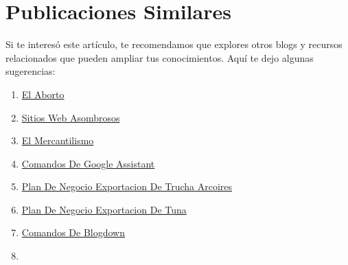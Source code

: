 \documentclass[
  jou,
  floatsintext,
  longtable,
  a4paper,
  nolmodern,
  notxfonts,
  notimes,
  colorlinks=true,linkcolor=blue,citecolor=blue,urlcolor=blue]{apa7}
\providecommand{\tightlist}{%
  \setlength{\itemsep}{0pt}\setlength{\parskip}{0pt}}
\begin{document}
\section{Publicaciones Similares}\label{publicaciones-similares}

Si te interesó este artículo, te recomendamos que explores otros blogs y
recursos relacionados que pueden ampliar tus conocimientos. Aquí te dejo
algunas sugerencias:

\begin{enumerate}
\def\labelenumi{\arabic{enumi}.}
\tightlist
\item
  \href{https://achalmaedison.netlify.app/blog/posts/2015-05-14-el-aborto/index.pdf}{}
  \href{https://achalmaedison.netlify.app/blog/posts/2015-05-14-el-aborto}{El
  Aborto}
\item
  \href{https://achalmaedison.netlify.app/blog/posts/2017-04-23-sitios-web-asombrosos/index.pdf}{}
  \href{https://achalmaedison.netlify.app/blog/posts/2017-04-23-sitios-web-asombrosos}{Sitios
  Web Asombrosos}
\item
  \href{https://achalmaedison.netlify.app/blog/posts/2017-05-23-el-mercantilismo/index.pdf}{}
  \href{https://achalmaedison.netlify.app/blog/posts/2017-05-23-el-mercantilismo}{El
  Mercantilismo}
\item
  \href{https://achalmaedison.netlify.app/blog/posts/2020-05-23-comandos-de-google-assistant/index.pdf}{}
  \href{https://achalmaedison.netlify.app/blog/posts/2020-05-23-comandos-de-google-assistant}{Comandos
  De Google Assistant}
\item
  \href{https://achalmaedison.netlify.app/blog/posts/2020-09-15-plan-de-negocio-exportacion-de-trucha-arcoires/index.pdf}{}
  \href{https://achalmaedison.netlify.app/blog/posts/2020-09-15-plan-de-negocio-exportacion-de-trucha-arcoires}{Plan
  De Negocio Exportacion De Trucha Arcoires}
\item
  \href{https://achalmaedison.netlify.app/blog/posts/2021-07-13-plan-de-negocio-exportacion-de-tuna/index.pdf}{}
  \href{https://achalmaedison.netlify.app/blog/posts/2021-07-13-plan-de-negocio-exportacion-de-tuna}{Plan
  De Negocio Exportacion De Tuna}
\item
  \href{https://achalmaedison.netlify.app/blog/posts/2021-07-14-comandos-de-blogdown/index.pdf}{}
  \href{https://achalmaedison.netlify.app/blog/posts/2021-07-14-comandos-de-blogdown}{Comandos
  De Blogdown}
\item

\end{enumerate}
\end{document}
